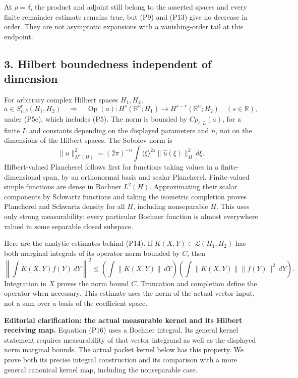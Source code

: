 \documentclass[
  11pt,
]{article}
\begin{document}
At \(\rho=\delta\), the product and adjoint still belong to the asserted
spaces and every finite remainder estimate remains true, but (P9) and
(P13) give no decrease in order. They are not asymptotic expansions with
a vanishing-order tail at this endpoint.

\subsection{3. Hilbert boundedness independent of
dimension}\label{hilbert-boundedness-independent-of-dimension}

For arbitrary complex Hilbert spaces \(H_1,H_2\), \[
 a\in S^r_{\rho,\delta}(H_1,H_2)
 \quad\Longrightarrow\quad
 \operatorname{Op}(a):H^s(\mathbb R^n;H_1)
 \longrightarrow H^{s-r}(\mathbb R^n;H_2)
 \quad(s\in\mathbb R),
\tag{P14}
\] under (P5e), which includes (P5). The norm is bounded by
\(Cp_{r,L}(a)\), for a finite \(L\) and constants depending on the
displayed parameters and \(n\), not on the dimensions of the Hilbert
spaces. The Sobolev norm is \[
 \|u\|_{H^s(H)}^2=(2\pi)^{-n}
 \int\langle\xi\rangle^{2s}\|\widehat u(\xi)\|_H^2\,d\xi.
\tag{P15}
\] Hilbert-valued Plancherel follows first for functions taking values
in a finite-dimensional span, by an orthonormal basis and scalar
Plancherel. Finite-valued simple functions are dense in Bochner
\(L^2(H)\). Approximating their scalar components by Schwartz functions
and taking the isometric completion proves Plancherel and Schwartz
density for all \(H\), including nonseparable \(H\). This uses only
strong measurability; every particular Bochner function is almost
everywhere valued in some separable closed subspace.

Here are the analytic estimates behind (P14). If
\(K(X,Y)\in\mathcal L(H_1,H_2)\) has both marginal integrals of its
operator norm bounded by \(C\), then \[
 \left\|\int K(X,Y)f(Y)\,dY\right\|^2
 \leq\left(\int\|K(X,Y)\|\,dY\right)
       \left(\int\|K(X,Y)\|\|f(Y)\|^2\,dY\right).
\tag{P16}
\] Integration in \(X\) proves the norm bound \(C\). Truncation and
completion define the operator when necessary. This estimate uses the
norm of the actual vector input, not a sum over a basis of the
coefficient space.

\textbf{Editorial clarification: the actual measurable kernel and its
Hilbert receiving map.} Equation (P16) uses a Bochner integral. Its
general kernel statement requires measurability of that vector integrand
as well as the displayed norm marginal bounds. The actual packet kernel
below has this property. We prove both its precise integral construction
and its comparison with a more general canonical kernel map, including
the nonseparable case.
\end{document}
